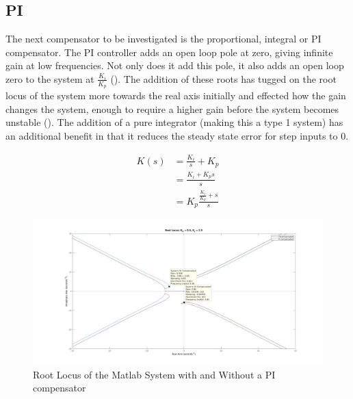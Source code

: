 \documentclass[a4paper, 11pt, compsoc]{IEEEtran}
\begin{document}
		\subsection{PI}\label{sec:pi}
			The next compensator to be investigated is the proportional, integral or PI compensator. The PI controller adds an open loop pole at zero, giving infinite gain at low frequencies. Not only does it add this pole, it also adds an open loop zero to the system at $\frac{K_i}{K_p}$ (). The addition of these roots has tugged on the root locus of the system more towards the real axis initially and effected how the gain changes the system, enough to require a higher gain before the system becomes unstable (). The addition of a pure integrator (making this a type 1 system) has an additional benefit in that it reduces the steady state error for step inputs to 0.
			\par
			\begin{equation}
				\label{eq:PIeq}
				\begin{split}
					K(s) & = \frac{K_i}{s} + K_p \\
						 & = \frac{K_i + K_ps}{s} \\
						 & = K_p \frac{\frac{K_i}{K_p} + s}{s}
				\end{split}
			\end{equation}

			\begin{figure}[!ht]
				\centering
				\includegraphics[width=\columnwidth]{lab6PIRlocus.jpg}
				\caption{Root Locus of the Matlab System with and Without a PI compensator}
				\label{fig:lab6PIRlocus}
			\end{figure}
\end{document}
